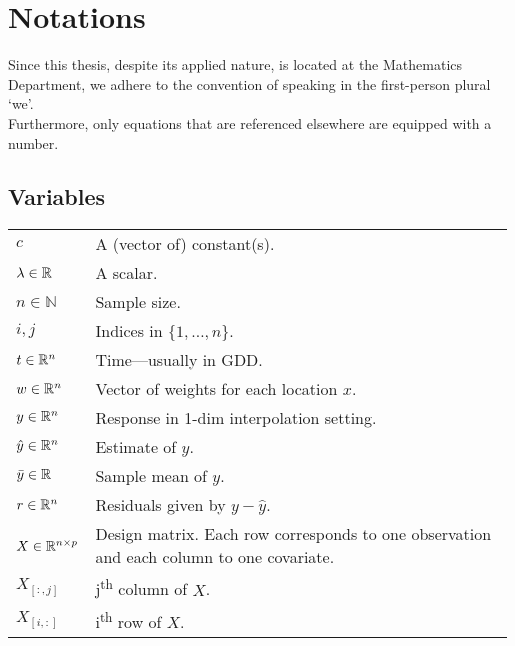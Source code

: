 \chapter*{\vspace{-3.5cm} Notations}
\label{c:Notation}
\vspace{-0.6cm}
Since this thesis, despite its applied nature, is located at the Mathematics Department, we adhere to the convention of speaking in the first-person plural `we'.\\
Furthermore, only equations that are referenced elsewhere are equipped with a number.

\section*{Variables}\vspace{-0.3cm}
\renewcommand{\arraystretch}{1.3} %
\begin{longtable}{p{0.12\linewidth} p{0.87\linewidth}}
$c$		& A (vector of) constant(s).\\
$\lambda \in \mathbb{R}$		& A scalar.\\
$n\in \mathbb{N}$		& Sample size.\\
$i,j$		& Indices in $\{1,\dots,n\}$.\\
$t\in \mathbb{R}^n$		& Time---usually in GDD.\\
$w \in \mathbb{R}^n$		& Vector of weights for each location $x$.\\
$y\in \mathbb{R}^n$		& Response in 1-dim interpolation setting.\\
$\hat y\in \mathbb{R}^n$		& Estimate of $y$.\\
$\bar y\in \mathbb{R}$		& Sample mean of $y$.\\
$r \in \mathbb{R}^n$		& Residuals given by $y - \hat y$.\\
$X\in\mathbb{R}^{n\times p}$ & Design matrix. Each row corresponds to one observation and each column to one covariate.\\
$X_{[:,j]}$ 	& j\textsuperscript{th} column of $X$.\\
$X_{[i,:]}$ 	& i\textsuperscript{th} row of $X$.
\end{longtable}

